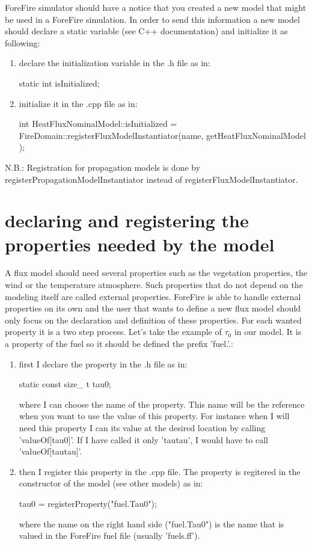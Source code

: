 ForeFire simulator should have a notice that you created a new model that might be used in a ForeFire simulation. In order to send this information a new model should declare a static variable (see C++ documentation) and initialize it as following:
\begin{enumerate}
\item declare the initialization variable in the .h file as in: \\ \begin{center}static int isInitialized;\end{center}
\item initialize it in the .cpp file as in: \\ \begin{center}int HeatFluxNominalModel::isInitialized = FireDomain::registerFluxModelInstantiator(name, getHeatFluxNominalModel );\end{center}
\end{enumerate}

N.B.: Registration for propagation models is done by registerPropagationModelInstantiator instead of registerFluxModelInstantiator.

\section{declaring and registering the properties needed by the model}

A flux model should need several properties such as the vegetation properties, the wind or the temperature atmosphere. Such properties that do not depend on the modeling itself are called external properties. ForeFire is able to handle external properties on its own and the user that wants to define a new flux model should only focus on the declaration and definition of these properties. For each wanted property it is a two step process. Let's take the example of $\tau_0$ in our model. It is a property of the fuel so it should be defined the prefix 'fuel.'.:
\begin{enumerate}
\item first I declare the property in the .h file as in: \\ \begin{center} static const size\_ t tau0; \end{center}
where I can choose the name of the property. This name will be the reference when you want to use the value of this property. For instance when I will need this property I can its value at the desired location by calling 'valueOf[tau0]'. If I have called it only 'tautau', I would have to call 'valueOf[tautau]'.
\item then I register this property  in the .cpp file. The property is regitered in the constructor of the model (see other models) as in: \\ \begin{center} tau0 = registerProperty("fuel.Tau0");\end{center} where the name on the right hand side ("fuel.Tau0") is the name that is valued in the ForeFire fuel file (usually 'fuels.ff').
\end{enumerate}

